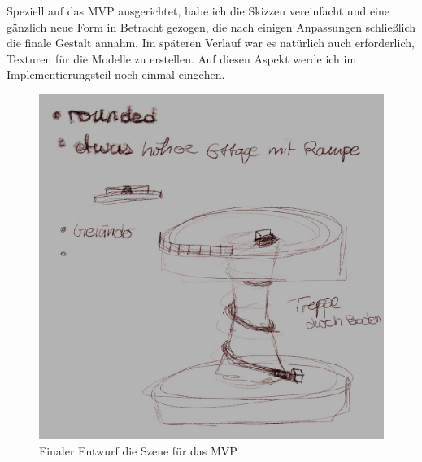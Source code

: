 \par
Speziell auf das MVP ausgerichtet, habe ich die Skizzen vereinfacht und eine gänzlich neue Form in Betracht gezogen, die nach einigen Anpassungen schließlich die finale Gestalt annahm. Im späteren Verlauf war es natürlich auch erforderlich, Texturen für die Modelle zu erstellen. Auf diesen Aspekt werde ich im Implementierungsteil noch einmal eingehen.
\begin{figure}[h]
	\centering
	\includegraphics[height=0.3\pageheight,keepaspectratio]{pics/5} 
	\caption{Finaler Entwurf die Szene für das MVP}
\end{figure}
